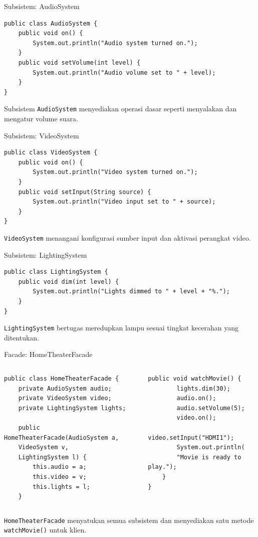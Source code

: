 \documentclass[aspectratio=169, table]{beamer}
\begin{document}
\begin{frame}[fragile]{Subsistem: AudioSystem}
\vspace{20pt}
\begin{lstlisting}[style=JavaStyle]
public class AudioSystem {
	public void on() {
		System.out.println("Audio system turned on.");
	}
	public void setVolume(int level) {
		System.out.println("Audio volume set to " + level);
	}
}
\end{lstlisting}
\small Subsistem \texttt{AudioSystem} menyediakan operasi dasar seperti menyalakan dan mengatur volume suara.
\end{frame}

\begin{frame}[fragile]{Subsistem: VideoSystem}
\vspace{20pt}
\begin{lstlisting}[style=JavaStyle]
public class VideoSystem {
	public void on() {
		System.out.println("Video system turned on.");
	}
	public void setInput(String source) {
		System.out.println("Video input set to " + source);
	}
}
\end{lstlisting}
\small \texttt{VideoSystem} menangani konfigurasi sumber input dan aktivasi perangkat video.
\end{frame}

\begin{frame}[fragile]{Subsistem: LightingSystem}
\vspace{20pt}
\begin{lstlisting}[style=JavaStyle]
public class LightingSystem {
	public void dim(int level) {
		System.out.println("Lights dimmed to " + level + "%.");
	}
}
\end{lstlisting}
\small \texttt{LightingSystem} bertugas meredupkan lampu sesuai tingkat kecerahan yang ditentukan.
\end{frame}

\begin{frame}[fragile]{Facade: HomeTheaterFacade}
\begin{columns}[T]
\begin{lstlisting}[style=JavaStyle, basicstyle=\ttfamily\scriptsize]
public class HomeTheaterFacade {
	private AudioSystem audio;
	private VideoSystem video;
	private LightingSystem lights;
	
	public HomeTheaterFacade(AudioSystem a,
	VideoSystem v,
	LightingSystem l) {
		this.audio = a;
		this.video = v;
		this.lights = l;
	}
\end{lstlisting}

\begin{lstlisting}[style=JavaStyle, basicstyle=\ttfamily\scriptsize]
	public void watchMovie() {
		lights.dim(30);
		audio.on();
		audio.setVolume(5);
		video.on();
		video.setInput("HDMI1");
		System.out.println(
		"Movie is ready to play.");
	}
}
\end{lstlisting}
\end{columns}

\vspace{5pt}
\small \texttt{HomeTheaterFacade} menyatukan semua subsistem dan menyediakan satu metode \texttt{watchMovie()} untuk klien.
\end{frame}
\end{document}
